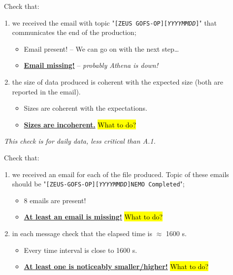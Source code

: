 \documentclass[twocolumn,8pt]{article}
\begin{document}
\begin{mdframed}[frametitle=(A.2)\ -- At 9 am]

\faEnvelope\ Check that:

\begin{enumerate}\itemsep0pt
    \item we received the email with topic "\texttt{[ZEUS GOFS-OP][\textit{YYYYMMDD}]}" that communicates the end of the production;
    \begin{itemize}\itemsep0pt
        \item[{\textcolor{ForestGreen}{\faCheckCircle}}] Email present! -- We can go on with the next step\dots
        \item[{\textcolor{Red}{\faTimesCircle}}] \ul{\textbf{Email missing!}} -- \textit{probably Athena is down!}
    \end{itemize}
    \item the size of data produced is coherent with the expected size (both are reported in the email).
    \begin{itemize}\itemsep0pt
        \item[{\textcolor{ForestGreen}{\faCheckCircle}}] Sizes are coherent with the expectations.
        \item[{\textcolor{Red}{\faTimesCircle}}] \ul{\textbf{Sizes are incoherent.}} \hl{What to do?}
    \end{itemize}
\end{enumerate}

\faInfoCircle\ \textit{This check is for daily data, less critical than A.1.}

\end{mdframed}    

\begin{mdframed}[frametitle=(A.3)\ -- At 9 am]

\faEnvelope\ Check that:

\begin{enumerate}\itemsep0pt
    \item we received an email for each of the file produced. Topic of these emails should be "\texttt{[ZEUS-GOFS-OP][\textit{YYYYMMDD}]NEMO Completed}";
        \begin{itemize}\itemsep0pt
        \item[{\textcolor{ForestGreen}{\faCheckCircle}}] 8 emails are present!
        \item[{\textcolor{Red}{\faTimesCircle}}] \ul{\textbf{At least an email is missing!}} \hl{What to do?}
        \end{itemize}
    \item in each message check that the elapsed time is $\approx$ 1600 s.
        \begin{itemize}\itemsep0pt
        \item[{\textcolor{ForestGreen}{\faCheckCircle}}] Every time interval is close to 1600 s.
        \item[{\textcolor{Red}{\faTimesCircle}}] \ul{\textbf{At least one is noticeably smaller/higher!}} \hl{What to do?}
        \end{itemize}
\end{enumerate}
\end{mdframed}    
\end{document}

